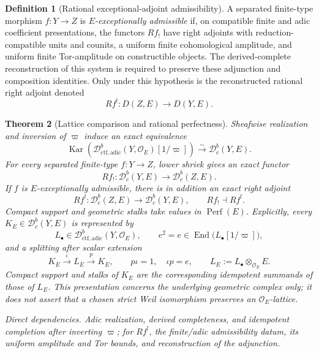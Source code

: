 \documentclass[10pt]{article}
\newtheorem{theorem}{Theorem}[section]
\theoremstyle{definition}
\newtheorem{definition}[theorem]{Definition}
\newcommand{\OO}{\mathcal O}
\newcommand{\Dbc}{\mathcal D^b_c}
\newcommand{\Perf}{\operatorname{Perf}}
\newcommand{\End}{\operatorname{End}}
\newcommand{\Kar}{\operatorname{Kar}}
\newcommand{\depends}[1]{\par\smallskip\noindent\textit{Direct dependencies.} #1\par}
\begin{document}
\begin{definition}[Rational exceptional-adjoint admissibility]
A separated finite-type morphism \(f:Y\to Z\) is
\emph{\(E\)-exceptionally admissible} if, on compatible finite and adic
coefficient presentations, the functors \(Rf_!\) have right adjoints with
reduction-compatible units and counits, a uniform finite cohomological
amplitude, and uniform finite Tor-amplitude on constructible objects.  The
derived-complete reconstruction of this system is required to preserve
these adjunction and composition identities.  Only under this hypothesis is
the reconstructed rational right adjoint denoted
\[
 Rf^!:D(Z,E)\longrightarrow D(Y,E).
\]
\end{definition}

\begin{theorem}[Lattice comparison and rational perfectness]
Sheafwise realization and inversion of \(\varpi\) induce an exact
equivalence
\[
 \Kar\!\left(
 \mathcal D^b_{\mathrm{ctf,adic}}(Y,\OO_E)[1/\varpi]\right)
 \xrightarrow{\sim}\Dbc(Y,E).
\]
For every separated finite-type \(f:Y\to Z\), lower shriek gives an exact
functor
\[
 Rf_!:\Dbc(Y,E)\longrightarrow\Dbc(Z,E).
\]
If \(f\) is \(E\)-exceptionally admissible, there is in addition an exact
right adjoint
\[
 Rf^!:\Dbc(Z,E)\longrightarrow\Dbc(Y,E),
 \qquad Rf_!\dashv Rf^!.
\]
Compact support and geometric stalks take values in
\(\Perf(E)\).  Explicitly, every \(K_E\in\Dbc(Y,E)\) is represented by
\[
 L_\bullet\in\mathcal D^b_{\mathrm{ctf,adic}}(Y,\OO_E),
 \qquad e^2=e\in
 \End\bigl(L_\bullet[1/\varpi]\bigr),
\]
and a splitting after scalar extension
\[
 K_E\xrightarrow{\iota}L_E
 \xrightarrow{p}K_E,\qquad p\iota=1,\quad\iota p=e,
 \qquad L_E:=L_\bullet\otimes_{\OO_E}E.
\]
Compact support and stalks of \(K_E\) are the corresponding idempotent
summands of those of \(L_E\).  This presentation concerns the underlying
geometric complex only; it does not assert that a chosen strict Weil
isomorphism preserves an \(\OO_E\)-lattice.
\depends{Adic realization, derived completeness, and idempotent completion
after inverting \(\varpi\); for \(Rf^!\), the finite/adic admissibility
datum, its uniform amplitude and Tor bounds, and reconstruction of the
adjunction.}
\end{theorem}
\end{document}
